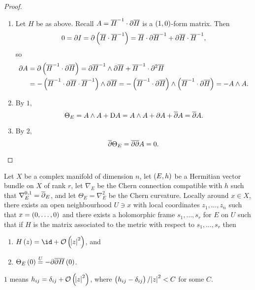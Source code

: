 \begin{proof}
\hfill
\begin{enumerate}
\item Let $ H $ be as above. Recall $ A = \overline{H}^{-1} \cdot \partial\overline{H} $ is a $ \br{1, 0} $-form matrix. Then
$$ 0 = \da I = \da\br{\overline{H} \cdot \overline{H}^{-1}} = \overline{H} \cdot \da\overline{H}^{-1} + \da\overline{H} \cdot \overline{H}^{-1}, $$
so
\begin{align*}
\da A
& = \da\br{\overline{H}^{-1} \cdot \da\overline{H}}
= \da\overline{H}^{-1} \wedge \da\overline{H} + \overline{H}^{-1} \cdot \da^2\overline{H} \\
& = -\br{\overline{H}^{-1} \cdot \da\overline{H} \cdot \overline{H}^{-1}} \wedge \da\overline{H}
= -\br{\overline{H}^{-1} \cdot \da\overline{H}} \wedge \br{\overline{H}^{-1} \cdot \da\overline{H}}
= -A \wedge A.
\end{align*}
\item By $ 1 $,
$$ \Theta_E = A \wedge A + \mathrm{D} A = A \wedge A + \partial A + \overline{\partial} A = \overline{\partial} A. $$
\item By $ 2 $,
$$ \overline{\partial}\Theta_E = \overline{\partial}\overline{\partial} A = 0. $$
\end{enumerate}
\end{proof}

\pagebreak

\begin{lemma}
Let $ X $ be a complex manifold of dimension $ n $, let $ \br{E, h} $ be a Hermitian vector bundle on $ X $ of rank $ r $, let $ \nabla_E $ be the Chern connection compatible with $ h $ such that $ \nabla_E^{0, 1} = \overline{\partial}_E $, and let $ \Theta_E = \nabla_E^2 $ be the Chern curvature. Locally around $ x \in X $, there exists an open neighbourhood $ U \ni x $ with local coordinates $ z_1, \dots, z_n $ such that $ x = \br{0, \dots, 0} $ and there exists a holomorphic frame $ s_1, \dots, s_r $ for $ E $ on $ U $ such that if $ H $ is the matrix associated to the metric with respect to $ s_1, \dots, s_r $ then
\begin{enumerate}
\item $ H\br{z} = \id + \OOO\br{\abs{z}^2} $, and
\item $ \Theta_E\br{0} \overset{U}{=} -\da\dab\overline{H}\br{0} $.
\end{enumerate}
\end{lemma}

$ 1 $ means $ h_{ij} = \delta_{ij} + \OOO\br{\abs{z}^2} $, where $ \br{h_{ij} - \delta_{ij}} / \abs{z}^2 < C $ for some $ C $.

